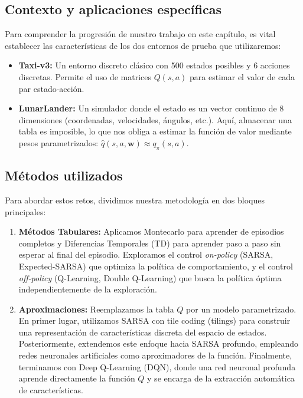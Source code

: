 \subsection{Contexto y aplicaciones específicas} %
Para comprender la progresión de nuestro trabajo en este capítulo, es vital establecer las características de los dos entornos de prueba que utilizaremos:
\begin{itemize}
    \item \textbf{Taxi-v3:} Un entorno discreto clásico con 500 estados posibles y 6 acciones discretas. Permite el uso de matrices $Q(s, a)$ para estimar el valor de cada par estado-acción.
    \item \textbf{LunarLander:} Un simulador donde el estado es un vector continuo de 8 dimensiones (coordenadas, velocidades, ángulos, etc.). Aquí, almacenar una tabla es imposible, lo que nos obliga a estimar la función de valor mediante pesos parametrizados: $\hat{q}(s, a, \mathbf{w}) \approx q_\pi(s, a)$.
\end{itemize}

\subsection{Métodos utilizados}
Para abordar estos retos, dividimos nuestra metodología en dos bloques principales:
\begin{enumerate}
    \item \textbf{Métodos Tabulares:} Aplicamos Montecarlo para aprender de episodios completos y Diferencias Temporales (TD) para aprender paso a paso sin esperar al final del episodio. Exploramos el control \textit{on-policy} (SARSA, Expected-SARSA) que optimiza la política de comportamiento, y el control \textit{off-policy} (Q-Learning, Double Q-Learning) que busca la política óptima independientemente de la exploración.
    \item \textbf{Aproximaciones:} Reemplazamos la tabla $Q$ por un modelo parametrizado. En primer lugar, utilizamos SARSA con tile coding (tilings) para construir una representación de características discreta del espacio de estados. Posteriormente, extendemos este enfoque hacia SARSA profundo, empleando redes neuronales artificiales como aproximadores de la función. Finalmente, terminamos con Deep Q-Learning (DQN), donde una red neuronal profunda aprende directamente la función $Q$ y se encarga de la extracción automática de características. 
\end{enumerate}


